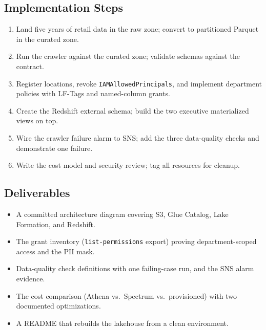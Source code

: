 \subsection*{Implementation Steps}
\begin{enumerate}
    \item Land five years of retail data in the raw zone; convert to partitioned Parquet in the curated zone.
    \item Run the crawler against the curated zone; validate schemas against the contract.
    \item Register locations, revoke \texttt{IAMAllowedPrincipals}, and implement department policies with LF-Tags and named-column grants.
    \item Create the Redshift external schema; build the two executive materialized views on top.
    \item Wire the crawler failure alarm to SNS; add the three data-quality checks and demonstrate one failure.
    \item Write the cost model and security review; tag all resources for cleanup.
\end{enumerate}

\subsection*{Deliverables}
\begin{itemize}
    \item A committed architecture diagram covering S3, Glue Catalog, Lake Formation, and Redshift.
    \item The grant inventory (\texttt{list-permissions} export) proving department-scoped access and the PII mask.
    \item Data-quality check definitions with one failing-case run, and the SNS alarm evidence.
    \item The cost comparison (Athena vs.\ Spectrum vs.\ provisioned) with two documented optimizations.
    \item A README that rebuilds the lakehouse from a clean environment.
\end{itemize}

